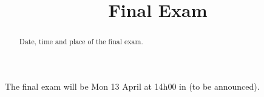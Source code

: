 \documentclass{ximera}
\title{Final Exam}
\begin{document}
\begin{abstract}
Date, time and place of the final exam.
\end{abstract}
\maketitle

The final exam will be Mon 13 April at 14h00 in (to be announced).
\end{document}
